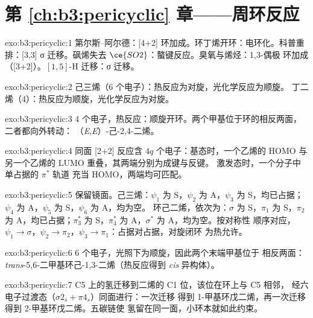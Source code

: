 \section*{第 \ref{ch:b3:pericyclic} 章——周环反应}

\begin{solution}{exo:b3:pericyclic:1}
第尔斯–阿尔德：[4+2] 环加成。环丁烯开环：电环化。科普重排：[3,3]
σ 迁移。砜烯失去 $\ce{SO2}$：螯键反应。臭氧与烯烃：1,3-偶极
环加成（[3+2]）。$[1,5]$-H 迁移：σ 迁移。
\end{solution}

\begin{solution}{exo:b3:pericyclic:2}
己三烯（6 个电子）：热反应为对旋，光化学反应为顺旋。
丁二烯（4）：热反应为顺旋，光化学反应为对旋。
\end{solution}

\begin{solution}{exo:b3:pericyclic:3}
4 个电子，热反应：顺旋开环。两个甲基位于环的相反两面，二者都向外转动：
（\textit{E},\textit{E}）-己-2,4-二烯。
\end{solution}

\begin{solution}{exo:b3:pericyclic:4}
同面 [2+2] 反应含 $4q$ 个电子：基态时，一个乙烯的 HOMO 与另一个乙烯的 LUMO
重叠，其两端分别为成键与反键。
激发态时，一个分子中单占据的 $\pi^*$ 轨道
充当 HOMO，两端均可匹配。
\end{solution}

\begin{solution}{exo:b3:pericyclic:5}
保留镜面。己三烯：$\psi_1$ 为 S，$\psi_2$ 为 A，$\psi_3$ 为 S，均已占据；$\psi_4$ 为 A，$\psi_5$ 为 S，$\psi_6$ 为 A，均为空。
环己二烯，依次为：$\sigma$ 为 S，$\pi_1$ 为 S，$\pi_2$ 为 A，均已占据；$\pi_3^*$ 为 S，$\pi_4^*$ 为 A，$\sigma^*$ 为 A，均为空。按对称性
顺序对应，$\psi_1 \to \sigma$，$\psi_2 \to \pi_2$，$\psi_3 \to \pi_1$：占据对占据，对旋闭环
为热允许。
\end{solution}

\begin{solution}{exo:b3:pericyclic:6}
6 个电子，光照下为顺旋，因此两个末端甲基位于
相反两面：\textit{trans}-5,6-二甲基环己-1,3-二烯（热反应得到
\textit{cis} 异构体）。
\end{solution}

\begin{solution}{exo:b3:pericyclic:7}
C5 上的氢迁移到二烯的 C1 位，该位在环上与 C5 相邻，
经六电子过渡态（$\sigma2_s + \pi4_s$）同面进行：一次迁移
得到 1-甲基环戊二烯，再一次迁移得到 2-甲基环戊二烯。五碳链使
氢留在同一面，小环本就如此约束。
\end{solution}

